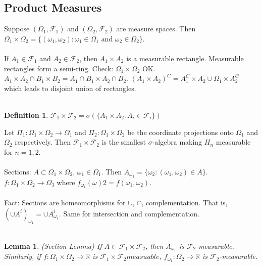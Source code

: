 \documentclass[12pt]{article}
\newtheorem{lemma}{Lemma}
\newtheorem{defn}{Definition}
\begin{document}
\subsection{Product Measures}
Suppose $(\Omega_1, \mathcal{F}_1)$ and $(\Omega_2, \mathcal{F}_2)$ are measure spaces.  Then $\Omega_1 \times \Omega_2 = \{(\omega_1, \omega_2) : \omega_1 \in \Omega_1 \textrm{ and } \omega_2 \in \Omega_2\}$.
\\ \\
If $A_1 \in \mathcal{F}_1$ and $A_2 \in \mathcal{F}_2$, then $A_1 \times A_2$ is a measurable rectangle.  Measurable rectangles form a semi-ring.  Check: $\Omega_1 \times \Omega_2$ OK.  $A_1 \times A_2 \cap B_1 \times B_2 = A_1 \cap B_1 \times A_2 \cap B_2$.  $(A_1 \times A_2)^C = A_1^C \times A_2 \cup \Omega_1 \times A_2^C$ which leads to disjoint union of rectangles.
\\ \\
\begin{defn} $\mathcal{F}_1 \times \mathcal{F}_2 = \sigma(\{A_1 \times A_2 : A_i \in \mathcal{F}_i\})$ \end{defn}
Let $\Pi_1 : \Omega_1 \times \Omega_2 \rightarrow \Omega_1$ and $\Pi_2 : \Omega_1 \times \Omega_2$ be the coordinate projections onto $\Omega_1$ and $\Omega_2$ respectively.  Then $\mathcal{F}_1 \times \mathcal{F}_2$ is the smallest $\sigma$-algebra making $\Pi_n$ measurable for $n = 1, 2$.
\\ \\
Sections: $A \subset \Omega_1 \times \Omega_2$, $\omega_1 \in \Omega_1$.  Then $A_{\omega_1} = \{ \omega_2 : (\omega_1, \omega_2) \in A \}$.  $f : \Omega_1 \times \Omega_2 \rightarrow \Omega_3$ where $f_{\omega_1}(\omega)2 = f(\omega_1, \omega_2)$.
\\ \\
Fact: Sections are homeomorphisms for $\cup$, $\cap$, complementation.  That is, $(\cup A^i)_{\omega_1} = \cup A^i_{\omega_1}$.  Same for intersection and complementation.
\\ \\
\begin{lemma}
(Section Lemma) If $A \subset \mathcal{F}_1 \times \mathcal{F}_2$, then $A_{\omega_1}$ is $\mathcal{F}_2$-measurable.  Similarly, if $f : \Omega_1 \times \Omega_2 \rightarrow \mathbb{R}$ is $\mathcal{F}_1 \times \mathcal{F}_2 measuable$, $f_{\omega_1} : \Omega_2 \rightarrow \mathbb{R}$ is $\mathcal{F}_2$-measurable.
\end{lemma}
\end{document}
